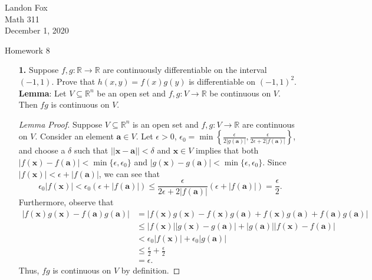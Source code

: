 \documentclass[ 12pt ]{article}
\begin{document}
\noindent Landon Fox \\
\noindent Math 311 \\
\noindent December 1, 2020

\begin{center}
	\Large Homework 8
\end{center}

\begin{enumerate}
	\item[\textbf{1.}] Suppose $f, g : \mathbb{R} \to \mathbb{R}$ are continuously differentiable on the interval $(-1, 1)$. Prove that $h(x, y) = f(x)g(y)$ is differentiable on $(-1,
		1)^2$. \\

		\textbf{Lemma}: Let $V \subseteq \mathbb{R}^n$ be an open set and $f, g : V \to \mathbb{R}$ be continuous on $V$. Then $fg$ is continuous on $V$.

		\begin{proof}[Lemma Proof]
			Suppose $V \subseteq \mathbb{R}^n$ is an open set and $f, g : V \to \mathbb{R}$ are continuous on $V$. Consider an element $\textbf{a} \in V$. Let $\epsilon > 0$,
			$\epsilon_0 = \min \left \{ \frac{\epsilon}{2|g(\textbf{a})|}, \frac{\epsilon}{2\epsilon + 2|f(\textbf{a})|} \right \}$, and choose a $\delta$ such that $||\textbf{x} -
			\textbf{a}|| < \delta$ and $\textbf{x} \in V$ implies that both $|f(\textbf{x}) - f(\textbf{a})| < \min \{ \epsilon, \epsilon_0 \}$ and $|g(\textbf{x}) - g(\textbf{a})| <
			\min \{ \epsilon, \epsilon_0 \}$. Since $|f(\textbf{x})| < \epsilon + |f(\textbf{a})|$, we can see that $$\epsilon_0 |f(\textbf{x})| < \epsilon_0(\epsilon + |f(\textbf{a})|)
			\leq \frac{\epsilon}{2\epsilon + 2|f(\textbf{a})|}(\epsilon + |f(\textbf{a})|) = \frac{\epsilon}{2}.$$ Furthermore, observe that 
			\begin{align*}
				|f(\textbf{x}) g(\textbf{x}) - f(\textbf{a}) g(\textbf{a})| &= |f(\textbf{x}) g(\textbf{x}) - f(\textbf{x}) g(\textbf{a}) + f(\textbf{x}) g(\textbf{a}) + f(\textbf{a}) g(\textbf{a})| \\
				&\leq |f(\textbf{x})| |g(\textbf{x}) - g(\textbf{a})| + |g(\textbf{a})||f(\textbf{x}) - f(\textbf{a})| \\
				&< \epsilon_0 |f(\textbf{x})| + \epsilon_0 |g(\textbf{a})| \\
				&\leq \frac{\epsilon}{2} + \frac{\epsilon}{2} \\
				&= \epsilon.
			\end{align*}
			Thus, $fg$ is continuous on $V$ by definition.
		\end{proof}


\end{enumerate}
\end{document}
